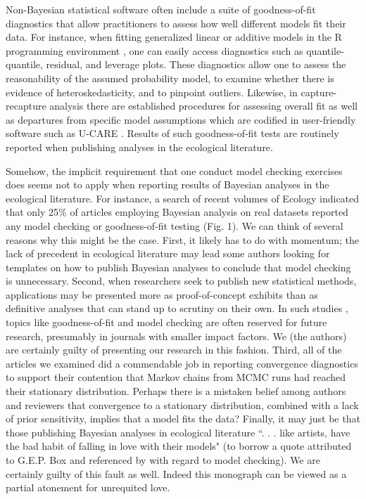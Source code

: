 \documentclass[12pt,english]{article}
\begin{document}
\begin{spacing}{1.9}
Non-Bayesian statistical software often include a suite of goodness-of-fit diagnostics that allow practitioners to assess how well different models fit their data.  For instance, when fitting generalized linear \citep{McCullaghNelder1989} or additive \citep{Wood2006} models in the R programming environment \citep{RTeam2013}, one can easily access diagnostics such as quantile-quantile, residual, and leverage plots.  These diagnostics allow one to assess the reasonability of the assumed probability model, to examine whether there is evidence of heteroskedasticity, and to pinpoint outliers.  Likewise, in capture-recapture analysis there are established procedures for assessing overall fit as well as departures from specific model assumptions which are codified in user-friendly software such as U-CARE \citep{ChoquetEtAl2009}.  Results of such goodness-of-fit tests are routinely reported when publishing analyses in the ecological literature.

Somehow, the implicit requirement that one conduct model checking exercises does seems not to apply when reporting results of Bayesian analyses in the ecological literature.  For instance, a search of recent volumes of Ecology indicated that only 25\% of articles employing Bayesian analysis on real datasets reported any model checking or goodness-of-fit testing (Fig. 1).  We can think of several reasons why this might be the case.  First, it likely has to do with momentum; the lack of precedent in ecological literature may lead some authors looking for templates on how to publish Bayesian analyses to conclude that model checking is unnecessary.  Second, when researchers seek to publish new statistical methods, applications may be presented more as proof-of-concept exhibits than as definitive analyses that can stand up to scrutiny on their own. In such studies \citep[and textbooks; see e.g.,][]{RoyleDorazio2008}, topics like goodness-of-fit and model checking are often reserved for future research, presumably in journals with smaller impact factors.  We (the authors) are certainly guilty of presenting our research in this fashion.  Third, all of the articles we examined did a commendable job in reporting convergence diagnostics to support their contention that Markov chains from MCMC runs had reached their stationary distribution.  Perhaps there is a mistaken belief among authors and reviewers that convergence to a stationary distribution, combined with a lack of prior sensitivity, implies that a model fits the data?  Finally, it may just be that those publishing Bayesian analyses in ecological literature ``. . . like artists, have the bad habit of falling in love with their models" (to borrow a quote attributed to G.E.P. Box and referenced by \citet{LinkBarker2010} with regard to model checking).  We are certainly guilty of this fault as well.  Indeed this monograph can be viewed as a partial atonement for unrequited love.


\end{spacing}
\end{document}
